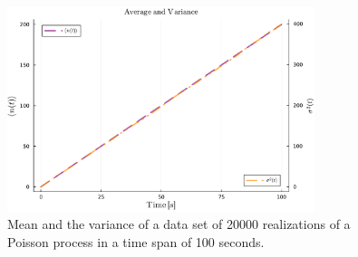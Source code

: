 \documentclass[main.tex]{subfiles}
\begin{document}
\begin{figure}[ht!]
    \centering
    \includegraphics[width=0.8\textwidth]{imgs/hw5/bdProcessAvergeVariance.pdf}
    \caption{Mean and the variance of a data set of \num{20000} realizations of a  Poisson process in a time span of 100 seconds.}
    \label{fig:bdProcessMeanVar}
\end{figure}



\end{document}
